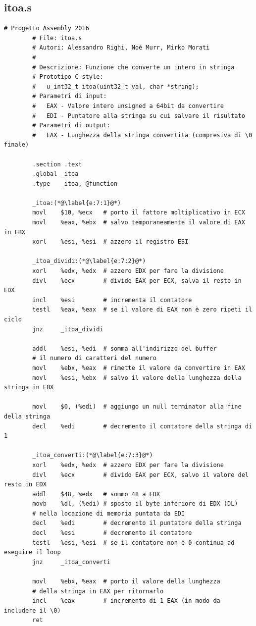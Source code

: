 \documentclass[a4paper,11pt]{article}
\begin{document}
		\subsection{itoa.s}
		\begin{lstlisting}[language=MyAssembler, style=MyAsm]
		# Progetto Assembly 2016
		# File: itoa.s
		# Autori: Alessandro Righi, Noè Murr, Mirko Morati
		#
		# Descrizione: Funzione che converte un intero in stringa
		# Prototipo C-style:
		#   u_int32_t itoa(uint32_t val, char *string);
		# Parametri di input:
		#   EAX - Valore intero unsigned a 64bit da convertire
		#   EDI - Puntatore alla stringa su cui salvare il risultato
		# Parametri di output:
		#   EAX - Lunghezza della stringa convertita (compresiva di \0 finale)
		
		.section .text
		.global _itoa
		.type   _itoa, @function
		
		_itoa:(*@\label{e:7:1}@*)
		movl    $10, %ecx   # porto il fattore moltiplicativo in ECX
		movl    %eax, %ebx  # salvo temporaneamente il valore di EAX in EBX
		xorl    %esi, %esi  # azzero il registro ESI
		
		_itoa_dividi:(*@\label{e:7:2}@*)
		xorl    %edx, %edx  # azzero EDX per fare la divisione
		divl    %ecx        # divide EAX per ECX, salva il resto in EDX
		incl    %esi        # incrementa il contatore
		testl   %eax, %eax  # se il valore di EAX non è zero ripeti il ciclo
		jnz     _itoa_dividi
		
		addl    %esi, %edi  # somma all'indirizzo del buffer
		# il numero di caratteri del numero
		movl    %ebx, %eax  # rimette il valore da convertire in EAX
		movl    %esi, %ebx  # salvo il valore della lunghezza della stringa in EBX
		
		movl    $0, (%edi)  # aggiungo un null terminator alla fine della stringa
		decl    %edi        # decremento il contatore della stringa di 1
		
		_itoa_converti:(*@\label{e:7:3}@*)
		xorl    %edx, %edx  # azzero EDX per fare la divisione
		divl    %ecx        # divido EAX per ECX, salvo il valore del resto in EDX
		addl    $48, %edx   # sommo 48 a EDX
		movb    %dl, (%edi) # sposto il byte inferiore di EDX (DL)
		# nella locazione di memoria puntata da EDI
		decl    %edi        # decremento il puntatore della stringa
		decl    %esi        # decremento il contatore
		testl   %esi, %esi  # se il contatore non è 0 continua ad eseguire il loop
		jnz     _itoa_converti
		
		movl    %ebx, %eax  # porto il valore della lunghezza
		# della stringa in EAX per ritornarlo
		incl    %eax        # incremento di 1 EAX (in modo da includere il \0)
		ret
		\end{lstlisting}
		
\end{document}
